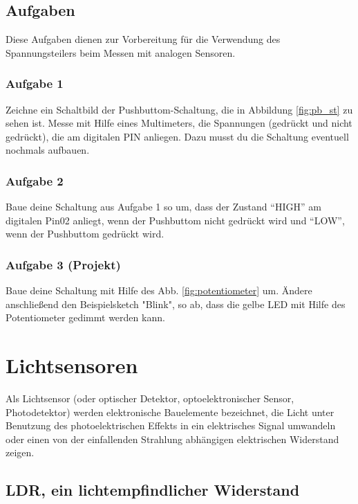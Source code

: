 \subsection{Aufgaben}

Diese Aufgaben dienen zur Vorbereitung für die Verwendung des Spannungsteilers beim Messen mit analogen Sensoren.  

\subsubsection{Aufgabe 1}
Zeichne ein Schaltbild der Pushbuttom-Schaltung, die in Abbildung \ref{fig:pb_st} zu sehen ist. Messe mit Hilfe eines Multimeters, die Spannungen (gedrückt und nicht gedrückt), die am digitalen PIN anliegen. Dazu musst du die Schaltung eventuell nochmals aufbauen.

\subsubsection{Aufgabe 2}
Baue deine Schaltung aus Aufgabe 1 so um, dass der Zustand ``HIGH'' am digitalen Pin02 anliegt, wenn der Pushbuttom nicht gedrückt wird und ``LOW'', wenn der  Pushbuttom gedrückt wird.

\subsubsection{Aufgabe 3 (Projekt)}
Baue deine Schaltung mit Hilfe des Abb. \ref{fig:potentiometer} um. Ändere anschließend den Beispielsketch "Blink", so ab, dass die gelbe LED mit Hilfe des Potentiometer gedimmt werden kann.   



\section{Lichtsensoren}
\label{sec:lichtsensoren}

Als Lichtsensor (oder optischer Detektor, optoelektronischer Sensor, Photodetektor) werden elektronische Bauelemente bezeichnet, die Licht unter Benutzung des photoelektrischen Effekts in ein elektrisches Signal umwandeln oder einen von der einfallenden Strahlung abhängigen elektrischen Widerstand zeigen. 

\subsection{LDR, ein lichtempfindlicher Widerstand}

